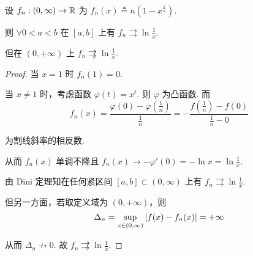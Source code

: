 \begin{example}
    设 $f_n:(0,\infty)\to\mathbb{R}$ 为 $f_n(x)\triangleq n(1-x^\frac{1}{n})$.

    则 $\forall 0<a<b$ 在 $[a,b]$ 上有 $f_n\rightrightarrows\ln\frac{1}{x}$.

    但在 $(0,+\infty)$ 上 $f_n\not\rightrightarrows\ln\frac{1}{x}$.
\end{example}
\begin{proof}
    当 $x=1$ 时 $f_n(1)=0$.

    当 $x\ne 1$ 时，考虑函数 $\varphi(t)=x^t$. 则 $\varphi$ 为凸函数. 而
$$
f_n(x)=\frac{\varphi(0)-\varphi(\frac{1}{n})}{\frac{1}{n}}=-\frac{f(\frac{1}{n})-f(0)}{\frac{1}{n}-0}
$$

    为割线斜率的相反数.

    \begin{center}
    \end{center}

    从而 $f_n(x)$ 单调不降且 $f_n(x)\to -\varphi'(0)=-\ln x=\ln\frac{1}{x}$.

    由 Dini 定理知在任何紧区间 $[a,b]\subset(0,\infty)$ 上有 $f_n\rightrightarrows\ln\frac{1}{x}$.

    但另一方面，若取定义域为 $(0,+\infty)$，则
$$
\Delta_n=\sup_{x\in(0,\infty)}\left\lvert{f(x)-f_n(x)}\right\rvert=+\infty
$$

    从而 $\Delta_n\not\to 0$. 故 $f_n\not\rightrightarrows\ln\frac{1}{x}$.
\end{proof}


